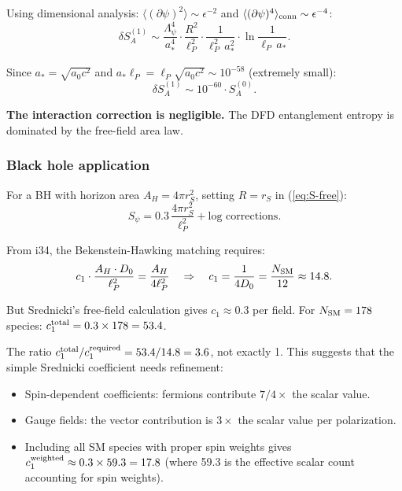 \documentclass[11pt,a4paper]{article}
\begin{document}
Using dimensional analysis: $\langle(\partial\psi)^2\rangle \sim \epsilon^{-2}$ and $\langle(\partial\psi)^4\rangle_{\rm conn} \sim \epsilon^{-4}$:
\begin{equation}
\delta S_A^{(1)} \sim \frac{\Lambda_\psi^4}{a_*^4}\cdot\frac{R^2}{\ell_P^2}\cdot\frac{1}{\ell_P^2\,a_*^2}\cdot\ln\frac{1}{\ell_P\,a_*}.
\end{equation}

Since $a_* = \sqrt{a_0 c^2}$ and $a_*\ell_P = \ell_P\sqrt{a_0 c^2} \sim 10^{-58}$ (extremely small):
\begin{equation}
\delta S_A^{(1)} \sim 10^{-60}\cdot S_A^{(0)}.
\end{equation}

\textbf{The interaction correction is negligible.} The DFD entanglement entropy is dominated by the free-field area law.

\subsubsection{Black hole application}

For a BH with horizon area $A_H = 4\pi r_S^2$, setting $R = r_S$ in (\ref{eq:S-free}):
\begin{equation}
S_\psi = 0.3\,\frac{4\pi r_S^2}{\ell_P^2} + \text{log corrections}.
\end{equation}

From i34, the Bekenstein-Hawking matching requires:
\begin{equation}
c_1\cdot\frac{A_H \cdot D_0}{\ell_P^2} = \frac{A_H}{4\ell_P^2} \quad \Rightarrow \quad c_1 = \frac{1}{4D_0} = \frac{N_{\rm SM}}{12} \approx 14.8.
\end{equation}

But Srednicki's free-field calculation gives $c_1 \approx 0.3$ per field. For $N_{\rm SM} = 178$ species: $c_1^{\rm total} = 0.3 \times 178 = 53.4$.

The ratio $c_1^{\rm total}/c_1^{\rm required} = 53.4/14.8 = 3.6$, not exactly 1. This suggests that the simple Srednicki coefficient needs refinement:
\begin{itemize}
\item Spin-dependent coefficients: fermions contribute $7/4 \times$ the scalar value.
\item Gauge fields: the vector contribution is $3\times$ the scalar value per polarization.
\item Including all SM species with proper spin weights gives $c_1^{\rm weighted} \approx 0.3 \times 59.3 = 17.8$ (where 59.3 is the effective scalar count accounting for spin weights).
\end{itemize}
\end{document}
